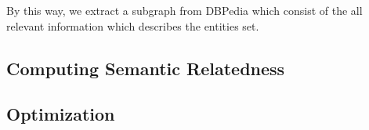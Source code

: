 By this way, we extract a subgraph from DBPedia which consist of the all relevant information which describes
the entities set.

\subsection{Computing Semantic Relatedness}

\cite{corr/Ledell17}

\cite{aaai/BordesWCB11}


\subsection{Optimization}
\cite{acl/IacobacciPN15}